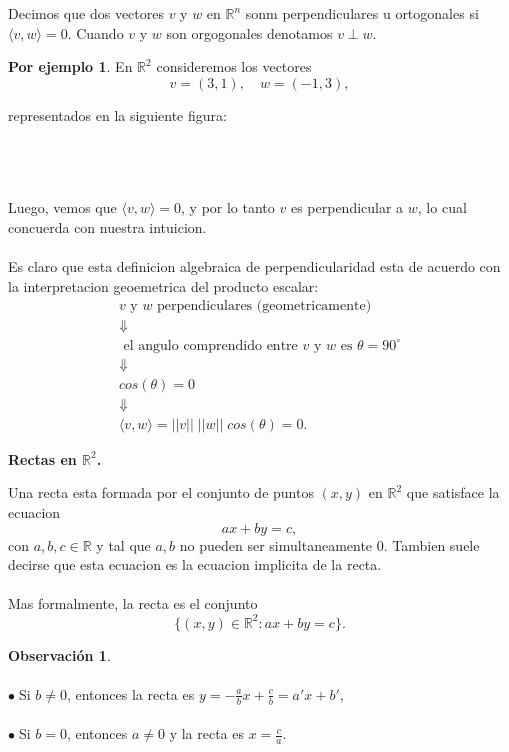 \documentclass{article}
\theoremstyle{definition}
\theoremstyle{definition}
\newtheorem*{obs}{Observación}
\newtheorem*{ej}{Por ejemplo}
\theoremstyle{remark}
\newcommand\bl{$\bullet\;$}
\begin{document}
\begin{defi}
Decimos que dos vectores $v$ y $w$ en $\mathbb{R}^n$ sonm perpendiculares u ortogonales si $ \langle v,w \rangle =0$. Cuando $v$ y $w$ son orgogonales denotamos $v \perp w$.
\end{defi}\pagebreak
\begin{ej}
  En $\mathbb{R}^2$ consideremos los vectores \[
v=(3,1), \quad w=(-1,3),
 \]
\end{ej}
 representados en la siguiente figura: \\\\
\begin{figure}[h]
\centering
\def\svgwidth{0.75\textwidth}

\end{figure}\\\\
Luego, vemos que $\langle v,w \rangle = 0$, y por lo tanto $v$ es perpendicular a $w$, lo cual concuerda con nuestra intuicion.
\\\\
Es claro que esta definicion algebraica de perpendicularidad esta de acuerdo con la interpretacion geoemetrica del producto escalar: \[
  \begin{array}{c}
  v \text{ y } w \text{ perpendiculares (geometricamente) } \\ \Downarrow \\
\text{ el angulo comprendido entre } v \text{ y } w \text{ es } \theta=90^{\circ}
\\
\Downarrow 
\\
cos(\theta)=0 \\
\Downarrow 
\\
\langle v,w \rangle = ||v|| \; ||w|| \; cos(\theta) = 0.
\end{array}
\]
\pagebreak
\begin{center}
  \textbf{Rectas en $\mathbb{R}^2$.}
\end{center}
\begin{defi}
  Una recta esta formada por el conjunto de puntos $(x,y)$ en $\mathbb{R}^2$ que satisface la ecuacion \[
ax+by=c,
\] con $a,b,c \in \mathbb{R}$ y tal que $a,b$ no pueden ser simultaneamente $0$. Tambien suele decirse que esta ecuacion es la ecuacion implicita de la recta. \\\\ Mas formalmente, la recta es el conjunto \[
\big\{(x,y) \in \mathbb{R}^2 : ax+by=c \big\}.
\]
\end{defi}
\begin{obs} \; \\\\
  \bl Si $b \neq 0 $, entonces la recta es $ y = -\frac{a}{b}x+\frac{c}{b}=a'x+b'$, \\\\
  \bl Si $b=0$, entonces $a \neq 0$ y la recta es $x=\frac{c}{a}$.
\end{obs}
\end{document}
